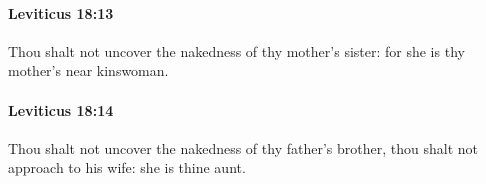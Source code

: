 		\paragraph{Leviticus 18:13} %
			\label{LEVITICUS-18-13}

			Thou shalt not uncover the nakedness of thy mother’s sister: for she is thy mother’s near kinswoman.


		\paragraph{Leviticus 18:14} %
			\label{LEVITICUS-18-14}

			Thou shalt not uncover the nakedness of thy father’s brother, thou shalt not approach to his wife: she is thine aunt.


